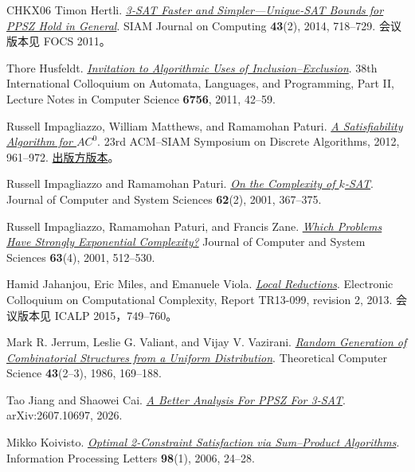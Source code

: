 \documentclass[11pt,reqno]{amsart}
\numberwithin{equation}{section}
\theoremstyle{definition}\newtheorem{definition}[theorem]{定义}
\theoremstyle{remark}\newtheorem{remark}[theorem]{注}
\begin{document}
\begin{thebibliography}{CHKX06}
Timon Hertli.
\href{https://doi.org/10.1137/120868177}
{\emph{3-SAT Faster and Simpler---Unique-SAT Bounds for PPSZ Hold in General}}.
SIAM Journal on Computing \textbf{43}(2), 2014, 718--729.
会议版本见 FOCS 2011。

Thore Husfeldt.
\href{https://doi.org/10.1007/978-3-642-22012-8_3}
{\emph{Invitation to Algorithmic Uses of Inclusion--Exclusion}}.
38th International Colloquium on Automata, Languages, and Programming,
Part II, Lecture Notes in Computer Science \textbf{6756}, 2011, 42--59.

Russell Impagliazzo, William Matthews, and Ramamohan Paturi.
\href{https://cseweb.ucsd.edu/~paturi/myPapers/pubs/ImpagliazzoMatthewsPaturi_2012_soda.pdf}
{\emph{A Satisfiability Algorithm for $AC^0$}}.
23rd ACM--SIAM Symposium on Discrete Algorithms, 2012, 961--972.
\href{https://doi.org/10.1137/1.9781611973099.77}{出版方版本}。

Russell Impagliazzo and Ramamohan Paturi.
\href{https://doi.org/10.1006/jcss.2000.1727}
{\emph{On the Complexity of $k$-SAT}}.
Journal of Computer and System Sciences \textbf{62}(2), 2001, 367--375.

Russell Impagliazzo, Ramamohan Paturi, and Francis Zane.
\href{https://doi.org/10.1006/jcss.2001.1774}
{\emph{Which Problems Have Strongly Exponential Complexity?}}
Journal of Computer and System Sciences \textbf{63}(4), 2001, 512--530.

Hamid Jahanjou, Eric Miles, and Emanuele Viola.
\href{https://eccc.weizmann.ac.il/report/2013/099/revision/2/download/}
{\emph{Local Reductions}}.
Electronic Colloquium on Computational Complexity, Report TR13-099,
revision 2, 2013. 会议版本见 ICALP 2015，749--760。

Mark R. Jerrum, Leslie G. Valiant, and Vijay V. Vazirani.
\href{https://doi.org/10.1016/0304-3975(86)90174-X}
{\emph{Random Generation of Combinatorial Structures from a Uniform Distribution}}.
Theoretical Computer Science \textbf{43}(2--3), 1986, 169--188.

Tao Jiang and Shaowei Cai.
\href{https://arxiv.org/abs/2607.10697}
{\emph{A Better Analysis For PPSZ For 3-SAT}}.
arXiv:2607.10697, 2026.

Mikko Koivisto.
\href{https://doi.org/10.1016/j.ipl.2005.11.013}
{\emph{Optimal 2-Constraint Satisfaction via Sum--Product Algorithms}}.
Information Processing Letters \textbf{98}(1), 2006, 24--28.


\end{thebibliography}
\end{document}
